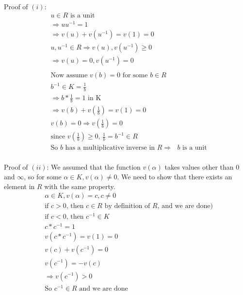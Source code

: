 \documentclass[11pt]{article}
\begin{document}
{\\
  Proof of $(i)$:
  \begin{align*}
     & u \in R \text{ is a unit}                                                    \\
     & \Rightarrow u u ^{-1} = 1                                                    \\
     & \Rightarrow v(u) + v(u^{-1}) = v(1) = 0                                      \\
     & u, u^{-1} \in R \Rightarrow v(u), v(u^{-1}) \geq 0                           \\
     & \Rightarrow v(u) = 0, v(u^{-1}) = 0                                          \\
     &                                                                              \\
     & \text{Now assume $v(b) = 0$ for some $b \in R$}                              \\
     & b^{-1} \in K = \frac{1}{b}                                                   \\
     & \Rightarrow b * \frac{1}{b} = 1 \text{ in K}                                 \\
     & \Rightarrow v(b) + v(\frac{1}{b}) = v(1) = 0                                 \\
     & v(b) = 0 \Rightarrow v(\frac{1}{b}) = 0                                      \\
     & \text{since $v(\frac{1}{b}) \geq 0$, $\frac{1}{b} = b^{-1} \in R$}           \\
     & \text{So $b$ has a multiplicative inverse in $R \Rightarrow $ $b$ is a unit} \\
  \end{align*}

  Proof of $(ii)$:
  \newline
  We assumed that the function $v(\alpha)$ takes values other than $0$ and $\infty$, so for some $\alpha \in K, v(\alpha) \neq 0$. We need to show that there exists an element in $R$ with the same property.
  \begin{align*}
     & \alpha \in K, v(\alpha) = c, c \neq 0                                    \\
     & \text{if $c > 0$, then $c \in R$ by definition of $R$, and we are done)} \\
     & \text{if $c < 0$, then $c^{-1} \in K$}                                   \\
     & c * c^{-1} = 1                                                           \\
     & v(c*c^{-1}) = v(1) = 0                                                   \\
     & v(c) + v(c^{-1}) = 0                                                     \\
     & v(c^{-1}) = -v(c)                                                        \\
     & \Rightarrow v(c^{-1}) > 0                                                \\
     & \text{So $c^{-1} \in R$ and we are done}
  \end{align*}

}
\end{document}
